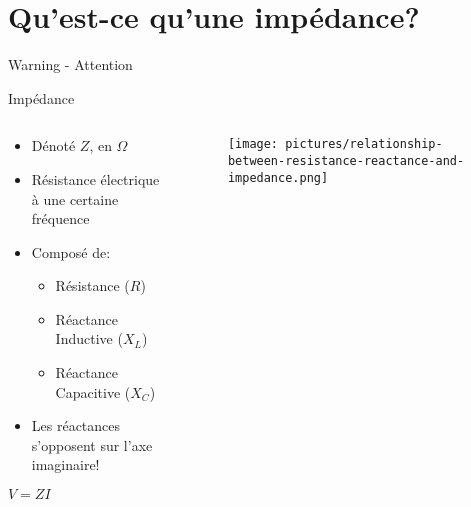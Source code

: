 
\section{Qu'est-ce qu'une impédance?}

\begin{frame}{Warning - Attention}
    \vspace{0cm}
\end{frame}

\begin{frame}{Impédance}
    \begin{columns}
        \begin{column}{0.5\textwidth}
            \begin{itemize}
                \item Dénoté $Z$, en $\Omega$
                \item Résistance électrique à une certaine fréquence
                \item Composé de:
                \begin{itemize}
                    \item Résistance ($R$)
                    \item Réactance Inductive ($X_L$)
                    \item Réactance Capacitive ($X_C$)
                \end{itemize}
                \item Les réactances s'opposent sur l'axe imaginaire!
            \end{itemize}
            \par
            \begin{center}
                \Large{$V = ZI$}
            \end{center}
        \end{column}
        
        \begin{column}{0.5\textwidth}
            \begin{figure}
                \centering
                \texttt{[image: pictures/relationship-between-resistance-reactance-and-impedance.png]}
            \end{figure}
        \end{column}
    \end{columns}
\end{frame}

